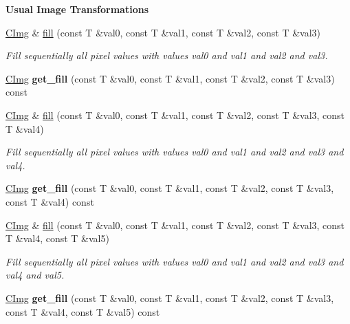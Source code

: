 \begin{Indent}{\bf Usual Image Transformations}
\begin{DoxyCompactItemize}
\item 
\hyperlink{structcimg__library_1_1_c_img}{CImg} \& \hyperlink{structcimg__library_1_1_c_img_a3806a6320480cd62070062bb1b5dce66}{fill} (const T \&val0, const T \&val1, const T \&val2, const T \&val3)
\begin{DoxyCompactList}\small\item\em Fill sequentially all pixel values with values {\itshape val0\/} and {\itshape val1\/} and {\itshape val2\/} and {\itshape val3\/}. \item\end{DoxyCompactList}\item 
\hypertarget{structcimg__library_1_1_c_img_a766f580fec2d712d2339b046e13f60b8}{
\hyperlink{structcimg__library_1_1_c_img}{CImg} {\bfseries get\_\-fill} (const T \&val0, const T \&val1, const T \&val2, const T \&val3) const }
\label{structcimg__library_1_1_c_img_a766f580fec2d712d2339b046e13f60b8}

\item 
\hyperlink{structcimg__library_1_1_c_img}{CImg} \& \hyperlink{structcimg__library_1_1_c_img_a293536ba4e18be8a7e6a9e427454b0e5}{fill} (const T \&val0, const T \&val1, const T \&val2, const T \&val3, const T \&val4)
\begin{DoxyCompactList}\small\item\em Fill sequentially all pixel values with values {\itshape val0\/} and {\itshape val1\/} and {\itshape val2\/} and {\itshape val3\/} and {\itshape val4\/}. \item\end{DoxyCompactList}\item 
\hypertarget{structcimg__library_1_1_c_img_ac705148d7cf7c78877524ae4bff26355}{
\hyperlink{structcimg__library_1_1_c_img}{CImg} {\bfseries get\_\-fill} (const T \&val0, const T \&val1, const T \&val2, const T \&val3, const T \&val4) const }
\label{structcimg__library_1_1_c_img_ac705148d7cf7c78877524ae4bff26355}

\item 
\hyperlink{structcimg__library_1_1_c_img}{CImg} \& \hyperlink{structcimg__library_1_1_c_img_a73ad439463a105fe882d4d226293a215}{fill} (const T \&val0, const T \&val1, const T \&val2, const T \&val3, const T \&val4, const T \&val5)
\begin{DoxyCompactList}\small\item\em Fill sequentially all pixel values with values {\itshape val0\/} and {\itshape val1\/} and {\itshape val2\/} and {\itshape val3\/} and {\itshape val4\/} and {\itshape val5\/}. \item\end{DoxyCompactList}\item 
\hypertarget{structcimg__library_1_1_c_img_a383ff96266d3e77b90bb6f179797980a}{
\hyperlink{structcimg__library_1_1_c_img}{CImg} {\bfseries get\_\-fill} (const T \&val0, const T \&val1, const T \&val2, const T \&val3, const T \&val4, const T \&val5) const }
\label{structcimg__library_1_1_c_img_a383ff96266d3e77b90bb6f179797980a}


\end{DoxyCompactItemize}
\end{Indent}

